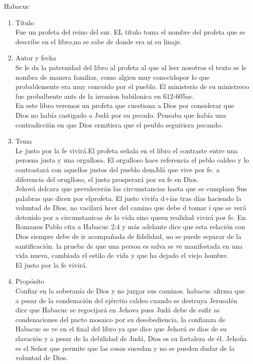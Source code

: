 \documentclass[12pt]{article}
\begin{document}
\begin{section}{Habacuc}
	\begin{enumerate}
		\item Título\\
			Fue un profeta del reino del sur. EL título toma el nombre del profeta que se describe en el libro,no se sabe de donde era ni su linaje.
		\item Autor y fecha\\
			Se le da la paternidad del libro al profeta al que al leer nosotros el texto se le nombra de manera familiar, como algien muy conocidopor lo que probablemente era muy concoido por el pueblo. El ministerio de su ministreoo fue probalbente ants de la invasion babilonica en 612-605ac.\\
			En este libro veremos un profeta que cuestiona a Dios por considerar que Dios no había castigado a Judá por su pecado. Pensaba que había una contradicción en que Dios ermitiera que el peublo seguiriera pecando.
		\item Tema\\
			Le justo por la fe vivirá.El profeta señala en el libro el contraste entre una perosna justa y una orgullosa. El orgulloso hace referencia el peblo caldeo y lo contrastará con aquellos justos del pueblo demJdá que vive por fe. a diferencia del oruglloso, el justo prosperará por su fe en Dios.\\
			Jehová delcara que prevalecerán las circunstancias hasta que se cumplasn Sus palabras que dicen por elprofeta. El justo viviŕa d+ías tras días haciendo la voluntad de Dios, no vacilará hcer del camino que debe d tomar i que se verá detenido por a circunstanicas de la vida sino queen realidad vivirá por fe. En Romanos Pablo cita a Habacuc 2:4 y más adelante dice que esta relación con Dios siempre debe de ir acompañada de fidelidad, no se puede separar de la santificación. la prueba de que una persoa es salva se ve manifestada en una vida nueva, cambiada el estilo de vida y que ha dejado el viejo hombre. \\
			El justo por la fe vivirá.
		\item Propósito\\
			Confiar en la soberanía de Dios y no juzgar sus caminos. habacuc afirma que a pesar de la condenación del ejérctio caldeo cuando se destruya Jerusalén dice que Habacuc se regocijará en Jehova pues Judá debe de sufir as condenaciones del pacto mosaico por  su desobediencia. la confianza de Habacuc se ve en el final del libro ya que dice que Jehová es dios de su slavación y a pesar de la debilidad de Judá, Dios es su fortaleza de él. Jehoǘa es el Señor que permite que las cosas sucedan y no se pueden dudar de la voluntad de Dios.

\end{enumerate}
\end{section}
\end{document}
